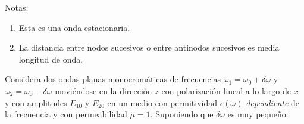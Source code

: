 \documentclass{exam}
\newenvironment{notas}{\par\noindent Notas:\begin{enumerate}} {\end{enumerate}}
\begin{document}
\begin{questions}
  \begin{notas}
  \item Esta es una onda estacionaria.
  \item La distancia entre nodos sucesivos o entre antinodos sucesivos
    es media longitud de onda.
  \end{notas}
\question\label{j} Considera dos ondas planas monocromáticas de
  frecuencias $\omega_1=\omega_0+\delta\omega$ y
  $\omega_2=\omega_0-\delta\omega$ moviéndose en la dirección $z$ con
  polarización lineal a lo largo de $x$ y con amplitudes $E_{10}$ y
  $E_{20}$ en un medio con permitividad $\epsilon(\omega)$ {\em
    dependiente} de la frecuencia y con permeabilidad
  $\mu=1$. Suponiendo que $\delta\omega$ es muy pequeño:
\end{questions}
\end{document}
